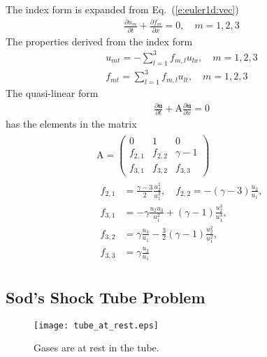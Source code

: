\documentclass{turgon}
\begin{document}
The index form is expanded from Eq.~(\ref{e:euler1d:vec})
%
\begin{align}
  \frac{\partial u_m}{\partial t} + \frac{\partial f_m}{\partial x}
  = 0, \quad m = 1, 2, 3
  \label{e:euler1:idx}
\end{align}
%
The properties derived from the index form
%
\begin{gather}
  u_{mt} = -\sum_{l=1}^3 f_{m,l} u_{lx},  \quad m = 1, 2, 3
  \label{e:euler1:ut}
  \\
  f_{mt} = \sum_{l=1}^3 f_{m,l} u_{lt},  \quad m = 1, 2, 3
  \label{e:euler1:ft}
\end{gather}
%
The quasi-linear form
%
\begin{align}
  \frac{\partial\mathbf{u}}{\partial t}
  + \mathrm{A} \frac{\partial\mathbf{u}}{\partial x} = 0
  \label{e:euler1d:qlinear}
\end{align}
%
has the elements in the matrix
%
\begin{gather}
  \begin{gathered}
    \mathrm{A} = \left(
    \begin{array}{ccc}
      0             & 1             & 0 \\
      f_{2,1} & f_{2,2} & \gamma - 1 \\
      f_{3,1} & f_{3,2} & f_{3,3}
    \end{array}
    \right)
    \\
    \begin{aligned}
      f_{2,1} &= \frac{\gamma-3}{2}\frac{u_2^2}{u_1^2}, \quad
      f_{2,2} = -(\gamma-3)\frac{u_2}{u_1}, \\
      f_{3,1} &= -\gamma\frac{u_2 u_3}{u_1^2}
      + (\gamma-1)\frac{u_2^3}{u_1^3}, \\
      f_{3,2} &= \gamma\frac{u_3}{u_1}
      - \frac{3}{2}(\gamma-1)\frac{u_2^2}{u_1^2}, \\
      f_{3,3} &= \gamma\frac{u_2}{u_1}
    \end{aligned}
  \end{gathered}
  \label{e:euler1d:jaco}
\end{gather}

\subsection{Sod's Shock Tube Problem}

\begin{figure}[h]
\centering
\texttt{[image: tube\_at\_rest.eps]}
\caption{Gases are at rest in the tube.}
\label{f:tube_at_rest}
\end{figure}
\end{document}
